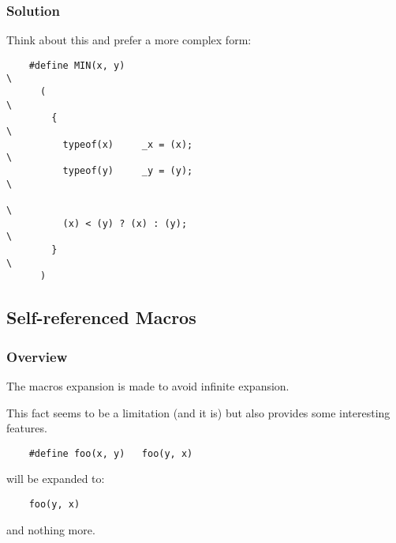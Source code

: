 \documentclass[9pt]{beamer}
\newcommand{\nl}[0]{\vspace{0.4cm}}
\begin{document}

\begin{frame}[containsverbatim]
  \frametitle{Solution}

  Think about this and prefer a more complex form:

  \begin{verbatim}
    #define MIN(x, y)                                                   \
      (                                                                 \
        {                                                               \
          typeof(x)     _x = (x);                                       \
          typeof(y)     _y = (y);                                       \
                                                                        \
          (x) < (y) ? (x) : (y);                                        \
        }                                                               \
      )
  \end{verbatim}
\end{frame}

%
%

\subsection{Self-referenced Macros}


\begin{frame}[containsverbatim]
  \frametitle{Overview}

  The macros expansion is made to avoid infinite expansion.

  \nl

  This fact seems to be a limitation (and it is) but also provides
  some interesting features.

  \begin{verbatim}
    #define foo(x, y)   foo(y, x)
  \end{verbatim}

  will be expanded to:

  \begin{verbatim}
    foo(y, x)
  \end{verbatim}

  and nothing more.
\end{frame}

\end{document}
